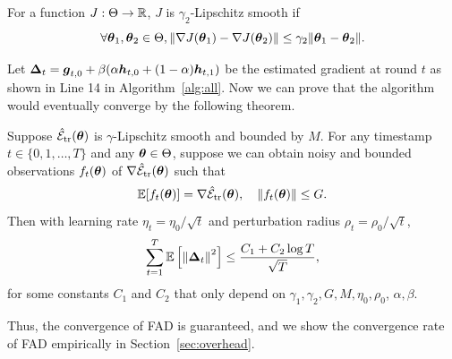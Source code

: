 \begin{definition} \label{defn:loss-smooth}
    For a function $J: \Theta \rightarrow \mathbb{R}$, $J$ is $\gamma_2$-Lipschitz smooth if
    \begin{equation}
        \forall \boldsymbol{\theta}_1, \boldsymbol{\theta}_2 \in \Theta, \left\|\nabla J(\boldsymbol{\theta}_1) - \nabla J(\boldsymbol{\theta}_2)\right\| \le \gamma_2 \|\boldsymbol{\theta}_1 - \boldsymbol{\theta}_2\|.
    \end{equation}
\end{definition}

Let $\boldsymbol{\Delta}_t = \boldsymbol{g}_{t,0} + \beta(\alpha \boldsymbol{h}_{t,0} + (1 - \alpha)\boldsymbol{h}_{t,1})$ be the estimated gradient at round $t$ as shown in Line 14 in Algorithm~\ref{alg:all}. Now we can prove that the algorithm would eventually converge by the following theorem.

\begin{theorem} \label{thrm:convergence-main}
    Suppose $\hat{\mathcal{E}}_{{\text{tr}}}(\boldsymbol{\theta})$ is $\gamma$-Lipschitz smooth and bounded by $M$. For any timestamp $t \in \{0, 1, \dots, T\}$ and any $\boldsymbol{\theta} \in \Theta$, suppose we can obtain noisy and bounded observations $f_t(\boldsymbol{\theta})$ of $\nabla \hat{\mathcal{E}}_{{\text{tr}}}(\boldsymbol{\theta})$ such that
    \begin{equation}
        \mathbb{E}[f_t(\boldsymbol{\theta})] = \nabla \hat{\mathcal{E}}_{{\text{tr}}}(\boldsymbol{\theta}), \quad \|f_t(\boldsymbol{\theta})\| \le G.
    \end{equation}
    Then with learning rate $\eta_t = \eta_0 / \sqrt{t}$ and perturbation radius $\rho_t = \rho_0 / \sqrt{t}$,
    \begin{equation}
        \sum_{t=1}^T \mathbb{E}\left[\left\|\boldsymbol{\Delta}_t\right\|^2\right] \le \frac{C_1 + C_2 \log T}{\sqrt{T}},
    \end{equation}
    for some constants $C_1$ and $C_2$ that only depend on $\gamma_1, \gamma_2, G, M, \eta_0, \rho_0$, $\alpha, \beta$.
\end{theorem}

Thus, the convergence of FAD is guaranteed, and we show the convergence rate of FAD empirically in Section~\ref{sec:overhead}.